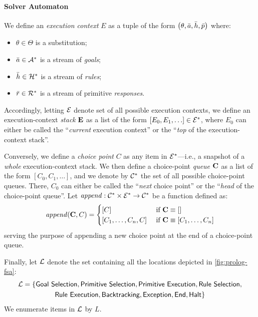\documentclass[12pt,a4paper,openright,twoside]{book}
\begin{document}
\paragraph{Solver Automaton}

We define an \emph{execution context} $E$ as a tuple of the form $\left( \theta, \bar{a}, \bar{h}, \bar{p} \right)$ where:
%
\begin{itemize}
    \item $\theta \in \Theta$ is a substitution;
    \item $\bar{a} \in \mathcal{A}^*$ is a stream of \emph{goals};
    \item $\bar{h} \in \mathcal{H}^*$ is a stream of \emph{rules};
    \item $\bar{r} \in \mathcal{R}^*$ is a stream of primitive \emph{responses}.
\end{itemize}
%
Accordingly, letting $\mathcal{E}$ denote set of all possible execution contexts, we define an execution-context \emph{stack} $\mathbf{E}$ as a list of the form $[E_0, E_1, \ldots] \in \mathcal{E}^*$, where $E_0$ can either be called the ``\emph{current} execution context'' or the ``\emph{top} of the execution-context stack''.

Conversely, we define a \emph{choice point} $C$ as any item in $\mathcal{E}^*$---i.e., a snapshot of a \emph{whole} execution-context stack.
%
We then define a choice-point \emph{queue} $\mathbf{C}$ as a list of the form $[C_0, C_1, \ldots]$, and we denote by $\mathcal{C}^*$ the set of all possible choice-point queues.
%
There, $C_0$ can either be called the ``\emph{next} choice point'' or the ``\emph{head} of the choice-point queue''.
%
Let $ \mathit{append} : \mathcal{C}^* \times \mathcal{E}^* \rightarrow \mathcal{C}^* $ be a function defined as:
%
\[
\mathit{append}(\mathbf{C}, C) = \begin{cases}
    [C] & \ \text{if}\ \mathbf{C} \equiv [] \\
    [C_1, \ldots, C_n, C] & \ \text{if}\ \mathbf{C} \equiv [C_1, \ldots, C_n] \\
\end{cases}
\]
%
serving the purpose of appending a new choice point at the end of a choice-point queue.

Finally, let $\mathcal{L}$ denote the set containing all the locations depicted in \cref{fig:prolog-fsa}:
%
\begin{multline*}
    \mathcal{L} = \{ \textsf{Goal Selection}, \textsf{Primitive Selection}, \textsf{Primitive Execution}, \textsf{Rule Selection},
    \\
    \textsf{Rule Execution}, \textsf{Backtracking}, \textsf{Exception}, \textsf{End}, \textsf{Halt} \}
\end{multline*}
%
We enumerate items in $\mathcal{L}$ by $L$.
\end{document}
